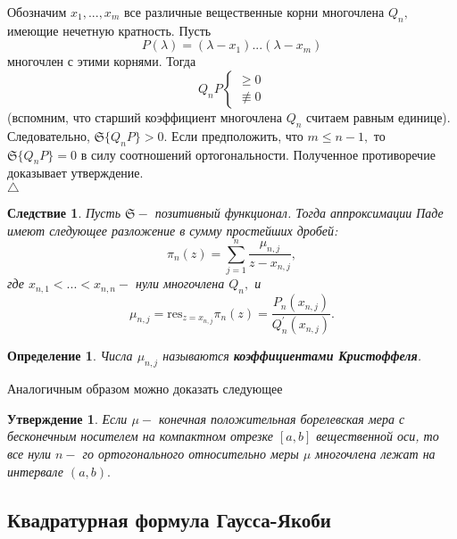 \documentclass[12 pt, a4 paper]{article}
\theoremstyle{plain}   \newtheorem{Pro}{Задача}
\newtheorem{Sta}{Утверждение}
\newtheorem{Def}{Определение}
\newtheorem{Cor}{Следствие}
\begin{document}
Обозначим
$ x_1 ,...,x_m $
все различные вещественные корни многочлена
$ Q_n , $
имеющие нечетную кратность. Пусть
$$
  P(\lambda )=(\lambda -x_1 )...(\lambda -x_m )
$$
многочлен с этими корнями. Тогда
\begin{equation*}
  Q_n P
  \begin{cases}
    \geq 0 \\
	\not \equiv 0
  \end{cases}
\end{equation*}
(вспомним, что старший коэффициент многочлена
$ Q_n $
считаем равным единице). Следовательно,
$ \mathfrak{S} \{ Q_n P \} >0. $
Если предположить, что
$ m \leq n-1 , $
то
$ \mathfrak{S} \{ Q_n P \} =0 $
в силу соотношений ортогональности. Полученное противоречие
доказывает утверждение.\\
$ \triangle $
\begin{Cor}
Пусть
$ \mathfrak{S} - $
позитивный функционал. Тогда аппроксимации Паде имеют
следующее разложение в сумму простейших дробей:
$$
  \pi _n (z) = \sum _{j=1}^n
  \frac{\mu _{n,j}}{z-x_{n,j}},
$$
где
$ x_{n,1}<...<x_{n,n} - $
нули многочлена
$ Q_n , $
и
$$
  \mu _{n,j}=\mathrm{res}_{z=x_{n,j}} \pi _n (z) =
  \frac{P_n (x_{n,j})}{Q_n ^{\prime}(x_{n,j})}.
$$
\end{Cor}
\begin{Def}
Числа
$ \mu _{n,j} $
называются
{\bfseries коэффициентами Кристоффеля}.
\end{Def}
Аналогичным образом можно доказать следующее
\begin{Sta}
Если
$ \mu - $
конечная положительная борелевская мера с бесконечным носителем
на компактном отрезке
$ [a,b] $
вещественной оси, то все нули $ n- $ го ортогонального
относительно меры
$ \mu $
многочлена лежат на интервале
$ (a,b) . $
\end{Sta}
\newpage
\subsection{Квадратурная формула Гаусса-Якоби}
$ \; $
\\
\end{document}
